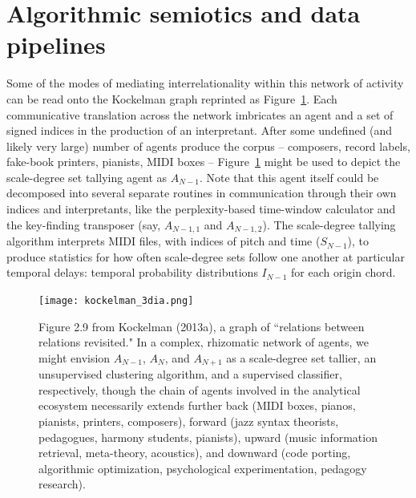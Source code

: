 \section{Algorithmic semiotics and data pipelines}
Some of the modes of mediating interrelationality within this network of activity can be read onto the Kockelman graph reprinted as Figure~\ref{kockelman_3dia}.  Each communicative translation across the network imbricates an agent and a set of signed indices in the production of an interpretant.  After some undefined (and likely very large) number of agents produce the corpus -- composers, record labels, fake-book printers, pianists, MIDI boxes -- Figure~\ref{kockelman_3dia} might be used to depict the scale-degree set tallying agent as $A_{N-1}$.  Note that this agent itself could be decomposed into several separate routines in communication through their own indices and interpretants, like the perplexity-based time-window calculator and the key-finding transposer (say, $A_{N-1,1}$ and $A_{N-1,2}$).  The scale-degree tallying algorithm interprets MIDI files, with indices of pitch and time ($S_{N-1}$), to produce statistics for how often scale-degree sets follow one another at particular temporal delays: temporal probability distributions $I_{N-1}$ for each origin chord. 

\begin{figure}%
	\centering
	\texttt{[image: kockelman\_3dia.png]}
	\caption{Figure 2.9 from Kockelman (2013a), a graph of ``relations between relations revisited."  In a complex, rhizomatic network of agents, we might envision $A_{N-1}$, $A_N$, and $A_{N+1}$ as a scale-degree set tallier, an unsupervised clustering algorithm, and a supervised classifier, respectively, though the chain of agents involved in the analytical ecosystem necessarily extends further back (MIDI boxes, pianos, pianists, printers, composers), forward (jazz syntax theorists, pedagogues, harmony students, pianists), upward (music information retrieval, meta-theory, acoustics), and downward (code porting, algorithmic optimization, psychological experimentation, pedagogy research).}
	\label{kockelman_3dia}
\end{figure}
 

